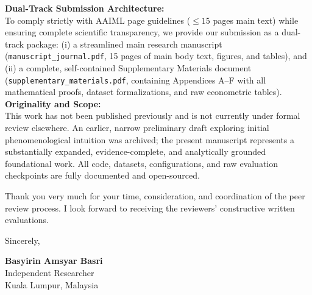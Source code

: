 \documentclass[11pt]{article}
\begin{document}
\vspace{0.8em}
\noindent
\textbf{Dual-Track Submission Architecture:} \\
To comply strictly with AAIML page guidelines ($\le 15$ pages main text) while ensuring complete scientific transparency, we provide our submission as a dual-track package: (i) a streamlined main research manuscript (\texttt{manuscript\_journal.pdf}, 15 pages of main body text, figures, and tables), and (ii) a complete, self-contained Supplementary Materials document (\texttt{supplementary\_materials.pdf}, containing Appendices A--F with all mathematical proofs, dataset formalizations, and raw econometric tables).
\vspace{0.8em}
\noindent
\textbf{Originality and Scope:} \\
This work has not been published previously and is not currently under formal review elsewhere. An earlier, narrow preliminary draft exploring initial phenomenological intuition was archived; the present manuscript represents a substantially expanded, evidence-complete, and analytically grounded foundational work. All code, datasets, configurations, and raw evaluation checkpoints are fully documented and open-sourced.

\vspace{0.8em}
\noindent
Thank you very much for your time, consideration, and coordination of the peer review process. I look forward to receiving the reviewers' constructive written evaluations.

\vspace{1.5em}
\noindent
Sincerely,

\vspace{1.5em}
\noindent
\textbf{Basyirin Amsyar Basri} \\
Independent Researcher \\
Kuala Lumpur, Malaysia
\end{document}
